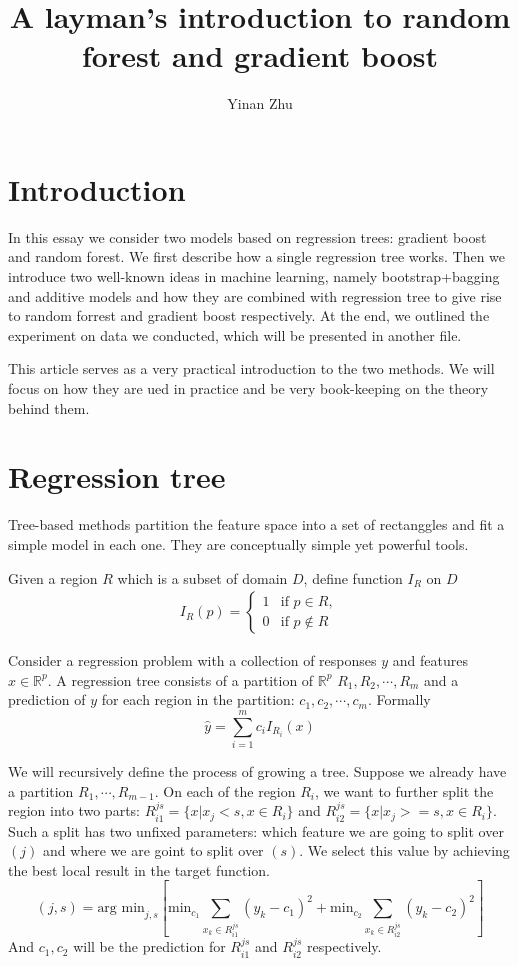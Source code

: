 \documentclass{article}
\title{A layman's introduction to random forest and gradient boost}
\author{Yinan Zhu}
\begin{document}
\maketitle
\section{Introduction}
In this essay we consider two models based on regression trees: gradient boost and random forest. We first describe how a single regression tree works. Then we introduce two well-known ideas in machine learning, namely bootstrap+bagging and additive models and how they are combined with regression tree to give rise to random forrest and gradient boost respectively. At the end, we outlined the experiment on data we conducted, which will be presented in another file. 

This article serves as a very practical introduction to the two methods. We will focus on how they are ued in practice and be very book-keeping on the theory behind them.

\section{Regression tree}
Tree-based methods partition the feature space into a set of rectanggles and fit a simple model in each one. They are conceptually simple yet powerful tools.

Given a region $R$ which is a subset of domain $D$, define function $I_R$ on $D$ 
\begin{eqnarray}
I_R(p)= \left\{
\begin{array}{rl}
1 & \textrm{if } p \in R,\\
0 & \textrm{if } p \notin R
\end{array} \right.\nonumber
\end{eqnarray}

Consider a regression problem with a collection of responses $y$ and features $x\in \mathbb{R}^p$. A regression tree consists of a partition of $\mathbb{R}^p$ $R_1, R_2,\cdots,R_m$ and a prediction of $y$ for each region in the partition: $c_1,c_2,\cdots,c_m$. Formally
\[
\hat{y}=\sum_{i=1}^m c_iI_{R_i}(x)
\]

We will recursively define the process of growing a tree. Suppose we already have a partition $R_1,\cdots, R_{m-1}$. On each of the region $R_i$, we want to further split the region into two parts: $R_{i1}^{js}=\{x|x_j<s,x\in R_i\}$ and $R_{i2}^{js}=\{x|x_j>=s,x\in R_i\}$. Such a split has two unfixed parameters: which feature we are going to split over $(j)$ and where we are goint to split over $(s)$. We select this value by achieving the best local result in the target function.
\[
(j,s)=\textrm{arg min}_{j,s}[\textrm{min}_{c_1}\sum_{x_k\in R_{i1}^{js}}(y_k-c_1)^2+\textrm{min}_{c_2}\sum_{x_k\in R_{i2}^{js}}(y_k-c_2)^2]
\]
And $c_1, c_2$ will be the prediction for $R_{i1}^{js}$ and $R_{i2}^{js}$ respectively.
\end{document}
